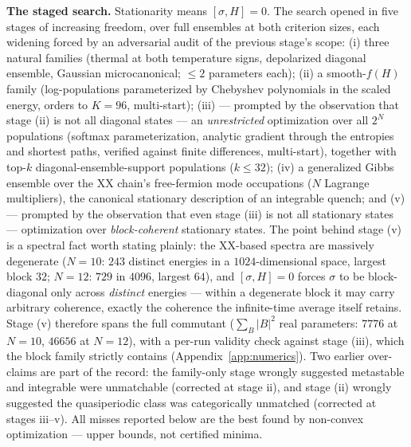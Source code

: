 \documentclass[a4paper,11pt,noarxiv]{quantumarticle}
\begin{document}
\textbf{The staged search.} Stationarity means $[\sigma, H]=0$. The
search opened in five stages of increasing freedom, over full
ensembles at both criterion sizes, each widening forced by an
adversarial audit of the previous stage's scope: (i) three natural
families (thermal at both
temperature signs, depolarized diagonal ensemble, Gaussian
microcanonical; $\leq 2$ parameters each); (ii) a smooth-$f(H)$ family
(log-populations parameterized by Chebyshev polynomials in the scaled
energy, orders to $K = 96$, multi-start); (iii) --- prompted by the
observation that stage (ii) is not all diagonal states --- an
\emph{unrestricted} optimization over all
$2^N$ populations (softmax parameterization, analytic gradient through
the entropies and shortest paths, verified against finite differences,
multi-start), together with top-$k$ diagonal-ensemble-support
populations ($k \leq 32$); (iv) a generalized Gibbs ensemble over the XX chain's
free-fermion mode occupations \cite{SRC065,SRC067} ($N$ Lagrange
multipliers), the canonical stationary description of an integrable
quench; and (v) --- prompted by the observation that even stage
(iii) is not all stationary states
--- optimization over \emph{block-coherent} stationary states. The
point behind stage (v) is a spectral fact worth stating plainly: the
XX-based spectra are massively degenerate ($N{=}10$: $243$ distinct
energies in a $1024$-dimensional space, largest block $32$; $N{=}12$:
$729$ in $4096$, largest $64$), and $[\sigma, H]=0$ forces $\sigma$ to
be block-diagonal only across \emph{distinct} energies --- within a
degenerate block it may carry arbitrary coherence, exactly the
coherence the infinite-time average itself retains. Stage (v)
therefore spans the full commutant ($\sum_B |B|^2$ real parameters:
$7776$ at $N{=}10$, $46656$ at $N{=}12$), with a per-run validity
check against stage (iii), which the block family strictly contains
(Appendix~\ref{app:numerics}). Two earlier
over-claims are part of the record: the family-only stage wrongly
suggested metastable and integrable were unmatchable (corrected at
stage ii), and stage (ii) wrongly suggested the quasiperiodic class
was categorically unmatched (corrected at stages iii--v). All misses
reported below are the best found by non-convex optimization ---
upper bounds, not certified minima.
\end{document}
